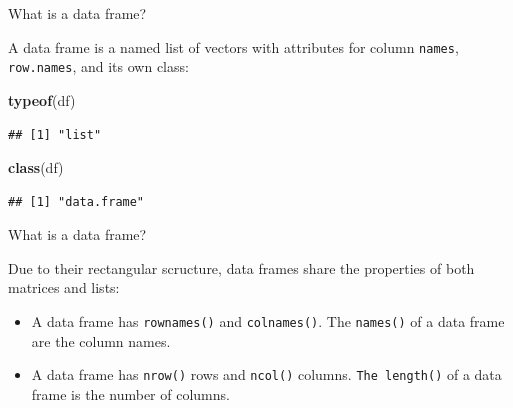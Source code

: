 \documentclass[ignorenonframetext,]{beamer}
\newenvironment{Shaded}{\begin{snugshade}}{\end{snugshade}}
\newcommand{\KeywordTok}[1]{\textcolor[rgb]{0.13,0.29,0.53}{\textbf{#1}}}
\newcommand{\NormalTok}[1]{#1}
\begin{document}
\begin{frame}[fragile]{What is a data frame?}
\protect\hypertarget{what-is-a-data-frame-2}{}

A data frame is a named list of vectors with attributes for column
\texttt{names}, \texttt{row.names}, and its own class:

\begin{Shaded}
\begin{Highlighting}[]
\KeywordTok{typeof}\NormalTok{(df) }
\end{Highlighting}
\end{Shaded}

\begin{verbatim}
## [1] "list"
\end{verbatim}

\begin{Shaded}
\begin{Highlighting}[]
\KeywordTok{class}\NormalTok{(df) }
\end{Highlighting}
\end{Shaded}

\begin{verbatim}
## [1] "data.frame"
\end{verbatim}

\end{frame}

\begin{frame}[fragile]{What is a data frame?}
\protect\hypertarget{what-is-a-data-frame-3}{}

Due to their rectangular scructure, data frames share the properties of
both matrices and lists:

\begin{itemize}
\item
  A data frame has \texttt{rownames()} and \texttt{colnames()}. The
  \texttt{names()} of a data frame are the column names.
\item
  A data frame has \texttt{nrow()} rows and \texttt{ncol()} columns.
  \texttt{The\ length()} of a data frame is the number of columns.
\end{itemize}

\end{frame}
\end{document}
